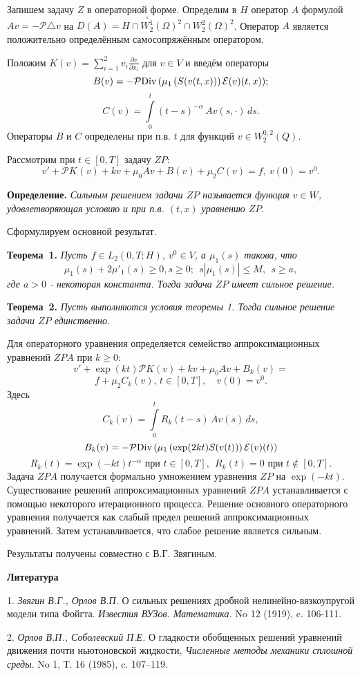 Запишем задачу $Z$ в операторной форме.
 Определим в $H$ оператор $A$ формулой $Av=-{\mathcal{P}}\triangle v$ на $D(A)=H \cap \stackrel{\circ}{W_2^1}(\Omega)^2\cap {W_2^2}(\Omega)^2$. Оператор $A$ является положительно определённым самосопряжённым оператором.

Положим
$K(v)=\sum_{i=1}^2 v_i\frac{\partial v}{\partial x_i}$ для $v\in V$ и введём операторы
$$
B(v) = - {\mathcal{P}}{\rm Div} \, (\mu_1\,(S(v(t,x)))\,\mathcal{E}(v)(t,x));
$$
$$ C(v)=\int\limits_{0}^t(t-s)^{-\alpha}\,A v(s, \cdot )\,ds.
$$
Операторы $B$ и
$C$ определены при п.в. $t$ для функций $v\in W_2^{0,2}(Q)$.

Рассмотрим при $ t\in[0,T]$ задачу $ZP$:
$$
v'+\mathcal{P}K_{}( v)+ k v+\mu_0 Av +B(v)+\mu_2C(v)= f,\ v(0)=v^0.
$$


\textbf{Определение.} {\it
Сильным решением задачи $ZP$ называется функция $v\in W$, удовлетворяющая условию и при п.в. $(t,x)$ уравнению $ZP$.}

Сформулируем основной результат.

\textbf{Теорема~1.} {\it Пусть $f\in L_2 (0,T;H)$, $v^0\in V$, а $\mu_1(s)$ такова, что
$$
 \mu_1(s)+2\mu'_1(s)\ge 0, s\ge 0; \ \ s|\mu_1(s)|\le M,\ \ s\ge a,
$$
где $a>0$ - некоторая константа. Тогда задача $ZP$ имеет сильное решение.}


\textbf{Теорема~2.} {\it Пусть выполняются условия теоремы 1.
Тогда сильное решение задачи $ZP$ единственно.}

 Для операторного уравнения
определяется семейство аппроксимационных уравнений $ZPA$ при $k\ge 0$:
$$
v'+\exp(kt)\mathcal{P}K(v)+ k v+\mu_0 Av +B_k(v)=
$$
$$
f+\mu_2 C_k(v),\, t\in[0,T], \quad v(0)=v^0.
$$
Здесь
$$
C_k(v)=\int\limits_{0}^tR_k(t-s)\,A v(s)\,ds,
$$
$$
B_k(v) = - {\mathcal{P}}{\rm Div} \, (\mu_1\,(\exp(2kt)S(v(t)))\,\mathcal{E}(v)(t))
$$
$$
R_k(t)=\exp(-kt)t^{-\alpha} \mbox{ при } t\in[0,T],\ \ R_k(t)=0 \mbox{ при } t\notin[0,T].
$$
 Задача $ZPA$ получается формально умножением уравнения $ZP$ на $\exp(-kt)$.
 Существование
решений аппроксимационных уравнений $ZPA$ устанавливается с помощью
некоторого итерационного процесса. Решение основного операторного уравнения получается как
слабый предел решений аппроксимационных уравнений. Затем устанавливается, что слабое решение является сильным.




Результаты получены совместно с В.Г. Звягиным.



\smallskip \centerline {\bf Литература} \nopagebreak

1. {\it Звягин В.Г., Орлов В.П.} О сильных решениях дроб\-ной не\-линейно-вязкоупругой модели типа Фойгта. {\it Известия \newline ВУЗов. Математика.} No 12 (1919), c. 106-111.

2. {\it Орлов В.П., Соболевский П.Е.} О гладкости обоб\-щен\-ных решений уравнений движения почти ньютоновской \newline жидкости, {\it Численные методы механики сплошной среды}. \newline No 1, Т. 16 (1985), c. 107--119.
